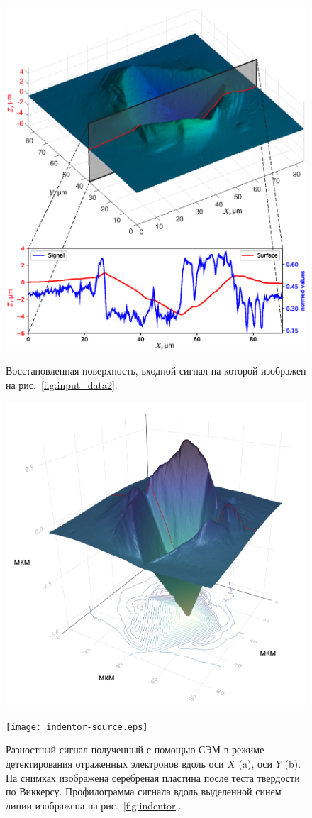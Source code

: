 \documentclass{beamer}
\begin{document}
\begin{frame}[c,allowframebreaks]
\framebreak

    \begin{figure}[t]
        \includegraphics[width=0.40\linewidth]{results.eps}
        \caption{Восстановленная поверхность, входной сигнал на которой изображен на
            рис.~\ref{fig:input_data2}.}
        {\label{fig:results}}
    \end{figure}

\framebreak

    \begin{figure}[ht]
        \includegraphics[width=0.55\linewidth]{crooked.png}
    \end{figure}

\framebreak

    \begin{figure}
        \texttt{[image: indentor-source.eps]}
        \caption{Разностный сигнал полученный с помощью СЭМ в режиме детектирования отраженных
            электронов вдоль оси $X$ (a), оси $Y$ (b). На снимках изображена серебреная пластина
            после теста твердости по Виккерсу. Профилограмма сигнала вдоль выделенной синем линии
        изображена на рис.~\ref{fig:indentor}.}%
        \label{fig:indentor-source}
    \end{figure}


\end{frame}
\end{document}
